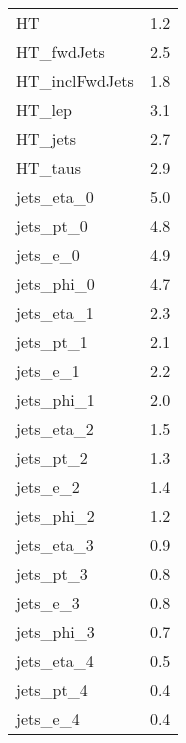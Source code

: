 \begin{longtable}{ll}
    HT                           & 1.2                          \\
    HT\_fwdJets                  & 2.5                          \\
    HT\_inclFwdJets              & 1.8                          \\
    HT\_lep                      & 3.1                          \\
    HT\_jets                     & 2.7                          \\
    HT\_taus                     & 2.9                          \\
    jets\_eta\_0                 & 5.0                          \\
    jets\_pt\_0                  & 4.8                          \\
    jets\_e\_0                   & 4.9                          \\
    jets\_phi\_0                 & 4.7                          \\
    jets\_eta\_1                 & 2.3                          \\
    jets\_pt\_1                  & 2.1                          \\
    jets\_e\_1                   & 2.2                          \\
    jets\_phi\_1                 & 2.0                          \\
    jets\_eta\_2                 & 1.5                          \\
    jets\_pt\_2                  & 1.3                          \\
    jets\_e\_2                   & 1.4                          \\
    jets\_phi\_2                 & 1.2                          \\
    jets\_eta\_3                 & 0.9                          \\
    jets\_pt\_3                  & 0.8                          \\ \hline
    jets\_e\_3                   & 0.8                          \\
    jets\_phi\_3                 & 0.7                          \\
    jets\_eta\_4                 & 0.5                          \\
    jets\_pt\_4                  & 0.4                          \\
    jets\_e\_4                   & 0.4                          \\

\end{longtable}
